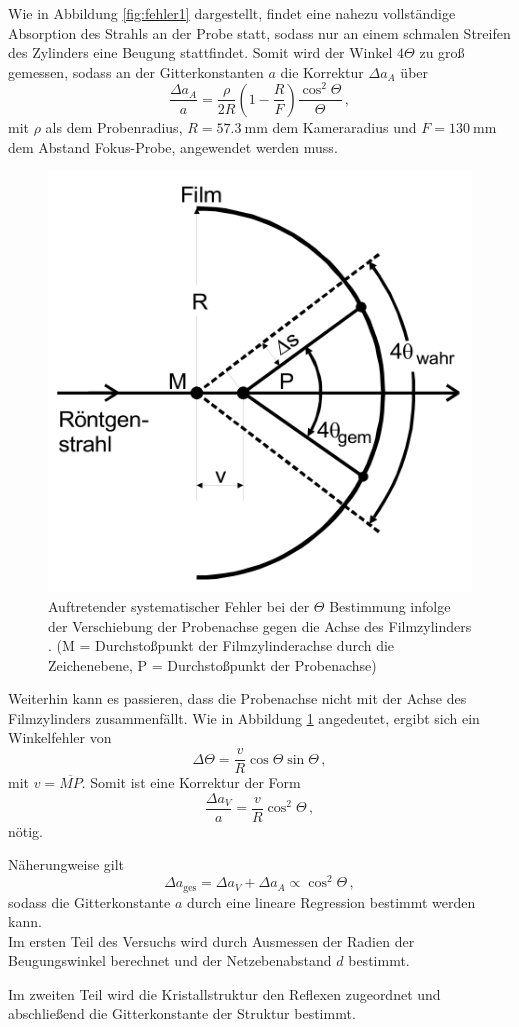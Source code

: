 Wie in Abbildung \ref{fig:fehler1} dargestellt, findet eine nahezu vollständige Absorption des Strahls an der Probe statt, sodass nur an einem schmalen Streifen des Zylinders eine Beugung stattfindet.
Somit wird der Winkel $4\Theta$ zu groß gemessen, sodass an der Gitterkonstanten $a$ die Korrektur $\Delta a_A$ über
\begin{equation*}
    \frac{\Delta a_A}{a} = \frac{\rho}{2R} \left(1-\frac{R}{F}\right) \frac{\cos^2{\Theta}}{\Theta}\,,
\end{equation*}
mit $\rho$ als dem Probenradius, $R=\SI{57.3}{\milli\meter}$ dem Kameraradius und $F=\SI{130}{\milli\meter}$ dem Abstand Fokus-Probe, angewendet werden muss.

\begin{figure}[h!]
    \centering
    \includegraphics[width=0.5\linewidth]{images/fehler2.png}
    \caption{Auftretender systematischer Fehler bei der $\Theta$ Bestimmung infolge der Verschiebung der Probenachse gegen die Achse des Filmzylinders \cite{V41}. (M = Durchstoßpunkt der Filmzylinderachse durch die Zeichenebene, P = Durchstoßpunkt der Probenachse)}
    \label{fig:fehler2}
\end{figure}
Weiterhin kann es passieren, dass die Probenachse nicht mit der Achse des Filmzylinders zusammenfällt.
Wie in Abbildung \ref{fig:fehler2} angedeutet, ergibt sich ein Winkelfehler von
\begin{equation*}
    \Delta \Theta = \frac{v}{R}\cos{\Theta}\sin\Theta\,,
\end{equation*}
mit $v=\overline{MP}$.
Somit ist eine Korrektur der Form
\begin{equation*}
    \frac{\Delta a_V}{a} = \frac{v}{R}\cos^2{\Theta}\,,
\end{equation*}
nötig.

Näherungweise gilt
\begin{equation*}
    \Delta a_\text{ges} = \Delta a_V + \Delta a_A \propto \cos^2{\Theta}\,,
\end{equation*}
sodass die Gitterkonstante $a$ durch eine lineare Regression bestimmt werden kann.
\\
Im ersten Teil des Versuchs wird durch Ausmessen der Radien der Beugungswinkel berechnet und der Netzebenabstand $d$ bestimmt.

Im zweiten Teil wird die Kristallstruktur den Reflexen zugeordnet und abschließend die Gitterkonstante der Struktur bestimmt.
